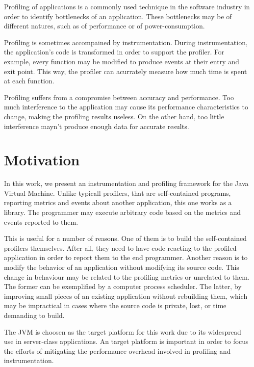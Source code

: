 
Profiling of applications is a commonly used technique in the software industry in order to identify bottlenecks of an application. These bottlenecks may be of different natures, such as of performance or of power-consumption.

Profiling is sometimes accompained by instrumentation. During instrumentation, the application's code is transformed in order to support the profiler. For example, every function may be modified to produce events at their entry and exit point. This way, the profiler can acurrately measure how much time is spent at each function.

Profiling suffers from a compromise between accuracy and performance. Too much interference to the application may cause its performance characteristics to change, making the profiling results useless. On the other hand, too little interference mayn't produce enough data for accurate results.


\section{Motivation}

In this work, we present an instrumentation and profiling framework for the Java Virtual Machine. Unlike typicall profilers, that are self-contained programs, reporting metrics and events about another application, this one works as a library. The programmer may execute arbitrary code based on the metrics and events reported to them.

This is useful for a number of reasons. One of them is to build the self-contained profilers themselves. After all, they need to have code reacting to the profiled application in order to report them to the end programmer. Another reason is to modify the behavior of an application without modifying its source code. This change in behaviour may be related to the profiling metrics or unrelated to them. The former can be exemplified by a computer process scheduler. The latter, by improving small pieces of an existing application without rebuilding them, which may be impractical in cases where the source code is private, lost, or time demanding to build.

The JVM is choosen as the target platform for this work due to its widespread use in server-class applications. An target platform is important in order to focus the efforts of mitigating the performance overhead involved in profiling and instrumentation.

